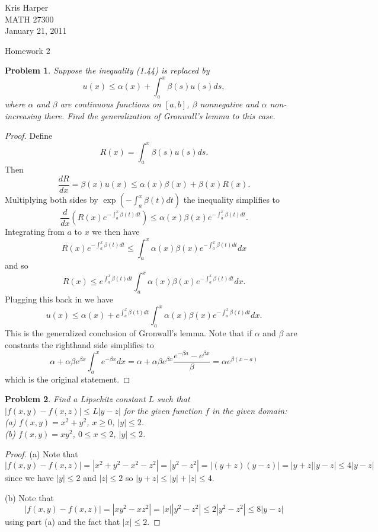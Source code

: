 \documentclass{article}
\newtheorem{problem}{Problem}
\begin{document}
\begin{flushright}
Kris Harper\\

MATH 27300\\

January 21, 2011
\end{flushright}

\begin{center}
Homework 2
\end{center}

\begin{problem}
Suppose the inequality (1.44) is replaced by
\[
u(x) \leq \alpha(x) + \int_a^x \beta(s) u(s) ds,
\]
where $\alpha$ and $\beta$ are continuous functions on $[a,b]$, $\beta$ nonnegative and $\alpha$ non-increasing there. Find the generalization of Gronwall's lemma to this case.
\end{problem}
\begin{proof}
Define
\[
R(x) = \int_a^x \beta(s) u(s) ds.
\]
Then
\[
\frac{dR}{dx} = \beta(x)u(x) \leq \alpha(x)\beta(x) + \beta(x)R(x).
\]
Multiplying both sides by $\exp \left ( -\int_a^x \beta(t) dt \right )$ the inequality simplifies to
\[
\frac{d}{dx} \left ( R(x) e^{-\int_a^x \beta(t) dt} \right ) \leq \alpha(x)\beta(x) e^{-\int_a^x \beta(t) dt}.
\]
Integrating from $a$ to $x$ we then have
\[
R(x)e^{-\int_a^x \beta(t) dt} \leq \int_a^x \alpha(x) \beta(x) e^{-\int_a^x \beta(t) dt} dx
\]
and so
\[
R(x) \leq e^{\int_a^x \beta(t) dt} \int_a^x \alpha(x) \beta(x) e^{-\int_a^x \beta(t) dt} dx.
\]
Plugging this back in we have
\[
u(x) \leq \alpha(x) + e^{\int_a^x \beta(t) dt} \int_a^x \alpha(x) \beta(x) e^{-\int_a^x \beta(t) dt} dx.
\]
This is the generalized conclusion of Gronwall's lemma. Note that if $\alpha$ and $\beta$ are constants the righthand side simplifies to
\[
\alpha + \alpha \beta e^{\beta x} \int_a^x e^{-\beta x} dx = \alpha + \alpha \beta e^{\beta x} \frac{e^{-\beta a} - e^{\beta x}}{\beta} = \alpha e^{\beta (x-a)}
\]
which is the original statement.
\end{proof}

\begin{problem}
Find a Lipschitz constant $L$ such that $|f(x,y) - f(x,z)| \leq L|y-z|$ for the given function $f$ in the given domain:\\
(a) $f(x,y) = x^2 + y^2$, $x \geq 0$, $|y| \leq 2$.\\
(b) $f(x,y) = xy^2$, $0 \leq x \leq 2$, $|y| \leq 2$.\\
\end{problem}
\begin{proof}
(a) Note that
\[
|f(x,y) - f(x,z)| = |x^2 + y^2 - x^2 - z^2| = |y^2 - z^2| = |(y+z)(y-z)| = |y+z||y-z| \leq 4|y-z|
\]
since we have $|y| \leq 2$ and $|z| \leq 2$ so $|y+z| \leq |y| + |z| \leq 4$.

(b) Note that
\[
|f(x,y) - f(x,z)| = |xy^2 - xz^2| = |x||y^2 - z^2| \leq 2|y^2 - z^2| \leq 8|y-z|
\]
using part (a) and the fact that $|x| \leq 2$.
\end{proof}
\end{document}
